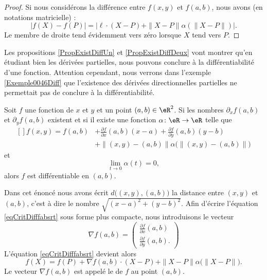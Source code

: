 \begin{proof}
    Si nous considérons la différence entre $f(x,y)$ et $f(a,b)$, nous avons (en notations matricielle) :
    \begin{equation}
        | f(X)-f(P) |=| \ell\cdot(X-P)+\| X-P \|\alpha(\| X-P \|) |.
    \end{equation}
    Le membre de droite tend évidemment vers zéro lorsque $X$ tend vers $P$.
\end{proof}

Les propositions \ref{PropExistDiffUn} et \ref{PropExistDiffDeux} vont montrer qu'en étudiant bien les dérivées partielles, nous pouvons conclure à la différentiabilité d'une fonction.
Attention cependant, nous verrons dans l'exemple \ref{Exemple0046Diff} que l'existence des dérivées directionnelles partielles ne permettait pas de conclure à la différentiabilité. 

\begin{proposition} \label{PropExistDiffUn}
    Soit $f$ une fonction de $x$ et $y$ et un point $(a,b)\in\eR^2$. Si les nombres $\partial_xf(a,b)$ et $\partial_yf(a,b)$ existent et si il existe une fonction $\alpha\colon \eR\to \eR$ telle que
    \begin{equation}        \label{eqCritDifffabsrt}
        \begin{aligned}[]
            f(x,y)=f(a,b)&+\frac{ \partial f }{ \partial x }(a,b)(x-a)+\frac{ \partial f }{ \partial y }(a,b)(y-b)\\
            &+\| (x,y)-(a,b) \| \alpha\Big( \| (x,y)-(a,b) \| \Big)
        \end{aligned}
    \end{equation}
    et
    \begin{equation}
        \lim_{t\to 0} \alpha(t)=0,
    \end{equation}
    alors $f$ est différentiable en $(a,b)$.
\end{proposition}
Dans cet énoncé nous avons écrit $d\big( (x,y),(a,b) \big)$ la distance entre $(x,y)$ et $(a,b)$, c'est à dire le nombre $\sqrt{(x-a)^2+(y-b)^2}$. Afin d'écrire l'équation \eqref{eqCritDifffabsrt} sous forme plus compacte, nous introduisons le vecteur
\begin{equation}
    \nabla f(a,b)=\begin{pmatrix}
        \frac{ \partial f }{ \partial x }(a,b)    \\ 
        \frac{ \partial f }{ \partial y }(a,b).    
    \end{pmatrix}
\end{equation}
L'équation \eqref{eqCritDifffabsrt} devient alors
\begin{equation}        \label{EqdiffComp}
    f(X)=f(P)+\nabla f(a,b)\cdot (X-P)+\| X-P \|\alpha\big( \| X-P \| \big).
\end{equation}
Le vecteur $\nabla f(a,b)$ est appelé le  de $f$ au point $(a,b)$.


